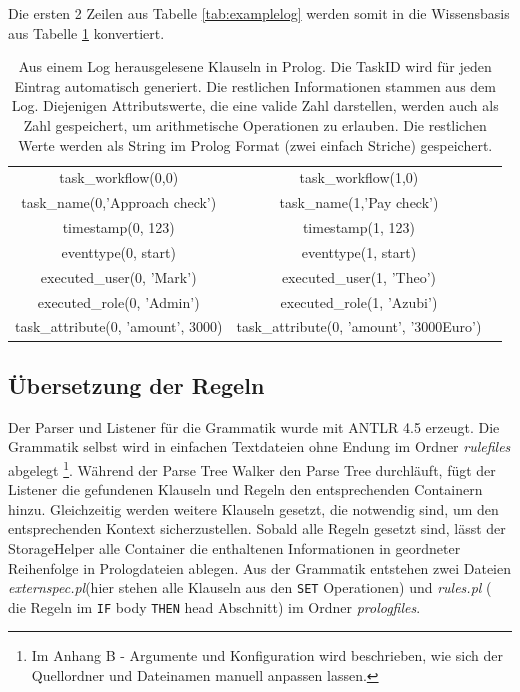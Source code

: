 Die ersten 2 Zeilen aus Tabelle \ref{tab:examplelog} werden somit in die Wissensbasis aus Tabelle \ref{tab:knowledge} konvertiert.
\begin{table}[h!]
\begin{tabular}{ccc}
task{\_}workflow(0,0)&task{\_}workflow(1,0)\\
task{\_}name(0,'Approach check')&task{\_}name(1,'Pay check')\\
timestamp(0, 123)&timestamp(1, 123)\\
eventtype(0, start)&eventtype(1, start)\\
executed{\_}user(0, 'Mark')&executed{\_}user(1, 'Theo')\\
executed{\_}role(0, 'Admin')&executed{\_}role(1, 'Azubi')\\
task\_attribute(0, 'amount', 3000)& task\_attribute(0, 'amount', '3000Euro')\\
\end{tabular}
\caption{Aus einem Log herausgelesene Klauseln in Prolog. Die TaskID wird für jeden Eintrag automatisch generiert. Die restlichen Informationen stammen aus dem Log. Diejenigen Attributswerte, die eine valide Zahl darstellen, werden auch als Zahl gespeichert, um arithmetische Operationen zu erlauben. Die restlichen Werte werden als String im Prolog Format (zwei einfach Striche) gespeichert. }
\label{tab:knowledge}
\end{table}


%
%
\subsection{Übersetzung der Regeln}
\label{sec:constraintreader}

Der Parser und Listener für die Grammatik wurde mit ANTLR 4.5 \cite{antlr} erzeugt. Die Grammatik selbst wird in einfachen Textdateien ohne Endung im Ordner \textit{rulefiles} abgelegt \footnote{Im Anhang B - Argumente und Konfiguration wird beschrieben, wie sich der Quellordner und Dateinamen manuell anpassen lassen.}. Während der Parse Tree Walker den Parse Tree durchläuft, fügt der Listener die gefundenen Klauseln und Regeln den entsprechenden Containern hinzu. Gleichzeitig werden weitere Klauseln gesetzt, die notwendig sind, um den entsprechenden Kontext sicherzustellen. Sobald alle Regeln gesetzt sind, lässt der StorageHelper alle Container die enthaltenen Informationen in geordneter Reihenfolge in Prologdateien ablegen. Aus der Grammatik entstehen zwei Dateien \textit{externspec.pl}(hier stehen alle Klauseln aus den \texttt{SET} Operationen) und \textit{rules.pl} ( die Regeln im \texttt{IF} body \texttt{THEN} head Abschnitt) im Ordner \textit{prologfiles}.\\

